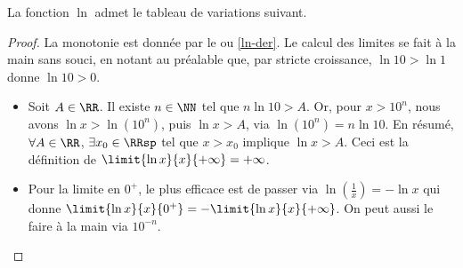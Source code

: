 \begin{fact} \label{ln-tab-var}
    La fonction $\ln$ admet le tableau de variations suivant.
    \begin{center}
    \end{center}
\end{fact}


\begin{proof}
    La monotonie est donnée par le  ou \ref{ln-der}.
    Le calcul des limites se fait à la main sans souci, en notant au préalable que, par stricte croissance, $\ln 10 > \ln 1$ donne $\ln 10 > 0$.
    \begin{itemize}
        \item Soit $A \in \RR$.
        Il existe $n \in \NN$ tel que $n \ln 10 > A$.
        Or, pour $x > 10^n$, nous avons $\ln x > \ln(10^n)$, puis $\ln x > A$, via $\ln(10^n) = n \ln 10$.
        En résumé,
        $\forall A \in \RR$, $\exists x_0 \in \RRsp$ tel que $x > x_0$ implique $\ln x > A$.
        Ceci est la définition de $\limit{\ln x}{x}{+ \infty} = +\infty$.

        \item Pour la limite en $0^+$, le plus efficace est de passer via $\ln(\frac1x) = - \ln x$ qui donne
        $\limit{\ln x}{x}{0^+} = - \limit{\ln x}{x}{+ \infty}$.
        On peut aussi le faire à la main via $10^{-n}$.
    \end{itemize}

    \null
    \vspace{-6ex}
\end{proof}

\vspace{1ex}
